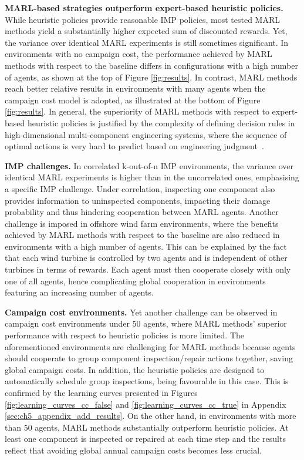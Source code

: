 \textbf{MARL-based strategies outperform expert-based heuristic policies.}
While heuristic policies provide reasonable IMP policies, most tested MARL methods yield a substantially higher expected sum of discounted rewards. 
Yet, the variance over identical MARL experiments is still sometimes significant.
In environments with no campaign cost, the performance achieved by MARL methods with respect to the baseline differs in configurations with a high number of agents, as shown at the top of Figure \ref{fig:results}.
In contrast, MARL methods reach better relative results in environments with many agents when the campaign cost model is adopted, as illustrated at the bottom of Figure \ref{fig:results}.
In general, the superiority of MARL methods with respect to expert-based heuristic policies is justified by the complexity of defining decision rules in high-dimensional multi-component engineering systems, where the sequence of optimal actions is very hard to predict based on engineering judgment~\citep{morato2022syst}.

\textbf{IMP challenges.}
In correlated k-out-of-n IMP environments, the variance over identical MARL experiments is higher than in the uncorrelated ones, emphasising a specific IMP challenge.
Under correlation, inspecting one component also provides information to uninspected components, impacting their damage probability and thus hindering cooperation between MARL agents.
Another challenge is imposed in offshore wind farm environments, where the benefits achieved by MARL methods with respect to the baseline are also reduced in environments with a high number of agents.
This can be explained by the fact that each wind turbine is controlled by two agents and is independent of other turbines in terms of rewards.
Each agent must then cooperate closely with only one of all agents, hence complicating global cooperation in environments featuring an increasing number of agents.

\textbf{Campaign cost environments.} Yet another challenge can be observed in campaign cost environments under 50 agents, where MARL methods' superior performance with respect to heuristic policies is more limited.
The aforementioned environments are challenging for MARL methods because agents should cooperate to group component inspection/repair actions together, saving global campaign costs.
In addition, the heuristic policies are designed to automatically schedule group inspections, being favourable in this case.
This is confirmed by the learning curves presented in Figures \ref{fig:learning_curves_cc_false} and \ref{fig:learning_curves_cc_true} in Appendix \ref{sec:ch5_appendix_add_results}.
On the other hand, in environments with more than 50 agents, MARL methods substantially outperform heuristic policies.
At least one component is inspected or repaired at each time step and the results reflect that avoiding global annual campaign costs becomes less crucial.

